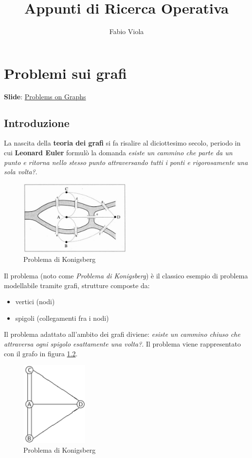 \documentclass[11pt]{book}
\title{Appunti di Ricerca Operativa}
\author{Fabio Viola}
\date{}
\begin{document}
\chapter{Problemi sui grafi}

\scriptsize
{\bf Slide}:
\href{http://www.or.deis.unibo.it/staff_pages/martello/Chapter7.zip}{Problems on Graphs}
\normalsize
\vspace{20pt}

\section{Introduzione}

La nascita della {\bf teoria dei grafi} si fa risalire al diciottesimo
secolo, periodo in cui {\bf Leonard Euler} formul\`o la domanda {\em
  esiste un cammino che parte da un punto e ritorna nello stesso punto
  attraversando tutti i ponti e rigorosamente una sola volta?}.

\begin{figure}[h!]
\centering
\includegraphics[width=0.5\textwidth]{images/cap7koni.jpg}
\caption{Problema di Konigsberg}
\label{cap7koni}
\end{figure}

Il problema (noto come {\em Problema di Konigsberg}) \`e il classico
esempio di problema modellabile tramite grafi, strutture composte da:

\begin{itemize}
\item vertici (nodi)
\item spigoli (collegamenti fra i nodi)
\end{itemize}


Il problema adattato all'ambito dei grafi diviene: {\em esiste un
  cammino chiuso che attraversa ogni spigolo esattamente una
  volta?}. Il problema viene rappresentato con il grafo in figura
\ref{cap7konig}.

\begin{figure}[h!]
  \centering
  \includegraphics[width=0.3\textwidth]{images/cap7konig.png}
  \caption{Problema di Konigsberg}
  \label{cap7konig}
\end{figure}
\end{document}
